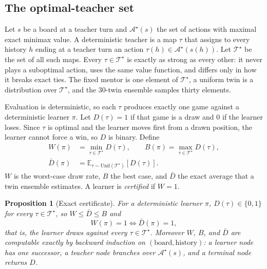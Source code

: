 \documentclass[conference]{IEEEtran}
\newtheorem{proposition}{Proposition}
\begin{document}
\subsection{The optimal-teacher set}
Let $s$ be a board at a teacher turn and $\mathcal{A}^{\star}(s)$ the set of actions with maximal exact minimax value. A deterministic teacher is a map $\tau$ that assigns to every history $h$ ending at a teacher turn an action $\tau(h)\in\mathcal{A}^{\star}(s(h))$. Let $\mathcal{T}^{\star}$ be the set of all such maps. Every $\tau\in\mathcal{T}^{\star}$ is exactly as strong as every other: it never plays a suboptimal action, uses the same value function, and differs only in how it breaks exact ties. The fixed mentor is one element of $\mathcal{T}^{\star}$, a uniform twin is a distribution over $\mathcal{T}^{\star}$, and the 30-twin ensemble samples thirty elements.

Evaluation is deterministic, so each $\tau$ produces exactly one game against a deterministic learner $\pi$. Let $D(\tau)=1$ if that game is a draw and $0$ if the learner loses. Since $\tau$ is optimal and the learner moves first from a drawn position, the learner cannot force a win, so $D$ is binary. Define
\begin{equation}
\label{eq:cert}
\begin{aligned}
W(\pi)&=\min_{\tau\in\mathcal{T}^{\star}}D(\tau), \qquad
B(\pi)=\max_{\tau\in\mathcal{T}^{\star}}D(\tau),\\
\bar D(\pi)&=\mathbb{E}_{\tau\sim\mathrm{Unif}(\mathcal{T}^{\star})}[D(\tau)].
\end{aligned}
\end{equation}
$W$ is the worst-case draw rate, $B$ the best case, and $\bar D$ the exact average that a twin ensemble estimates. A learner is \emph{certified} if $W=1$.

\begin{proposition}[Exact certificate]
\label{prop:cert}
For a deterministic learner $\pi$, $D(\tau)\in\{0,1\}$ for every $\tau\in\mathcal{T}^{\star}$, so $W\le\bar D\le B$ and
\begin{equation}
W(\pi)=1 \iff \bar D(\pi)=1,
\end{equation}
that is, the learner draws against every $\tau\in\mathcal{T}^{\star}$.
Moreover $W$, $B$, and $\bar D$ are computable exactly by backward induction on $(\text{board},\text{history})$: a learner node has one successor, a teacher node branches over $\mathcal{A}^{\star}(s)$, and a terminal node returns $D$.
\end{proposition}
\end{document}
